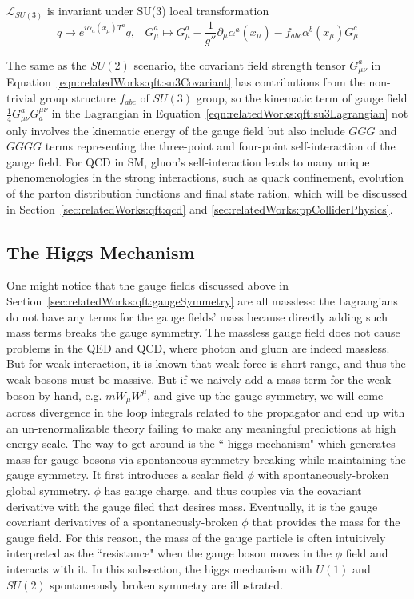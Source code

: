 \noindent $\mathcal{L}_{SU(3)}$ is invariant under SU(3) local transformation 
\begin{equation}
	q \longmapsto  e^{i\alpha_a (x_\mu) T^a} q , \;\;\; 
    G^a_\mu \longmapsto  G^a_\mu - \frac{1}{g''}\partial_\mu \alpha^a(x_\mu) - f_{abc}\alpha^b(x_\mu) G^c_\mu 
\end{equation}



\noindent The same as the $SU(2)$  scenario, the covariant field strength tensor $G^a_{\mu\nu}$ in Equation~\ref{eqn:relatedWorks:qft:su3Covariant}  has contributions from the non-trivial group structure $f_{abc}$ of $SU(3)$ group, so the kinematic term of gauge field $\frac{1}{4}G^a_{\mu\nu}G^{\mu\nu}_a$ in the Lagrangian in Equation~\ref{eqn:relatedWorks:qft:su3Lagrangian} not only involves the kinematic energy of the gauge field but also include $GGG$ and $GGGG$ terms representing the three-point and four-point self-interaction of the gauge field. For QCD in SM, gluon's self-interaction leads to many unique phenomenologies in the strong interactions, such as quark confinement, evolution of the parton distribution functions and final state ration, which will be discussed in Section~\ref{sec:relatedWorks:qft:qcd} and \ref{sec:relatedWorks:ppColliderPhysics}.





\subsection{The Higgs Mechanism}
\label{sec:relatedWorks:qft:higgsMechanism}
One might notice that the gauge fields discussed above in Section~\ref{sec:relatedWorks:qft:gaugeSymmetry} are all massless: the Lagrangians do not have any terms for the gauge fields' mass because directly adding such mass terms breaks the gauge symmetry. The massless gauge field does not cause problems in the QED and QCD, where photon and gluon are indeed massless. But for weak interaction, it is known that weak force is short-range, and thus the weak bosons must be massive. But if we naively add a mass term for the weak boson by hand, e.g. $m W_\mu W^\mu$, and give up the gauge symmetry, we will come across divergence in the loop integrals related to the propagator and end up with an un-renormalizable theory failing to make any meaningful predictions at high energy scale. The way to get around is the `` higgs mechanism" which generates mass for gauge bosons via spontaneous symmetry breaking while maintaining the gauge symmetry. It first introduces a scalar field $\phi$ with spontaneously-broken global symmetry. $\phi$ has gauge charge, and thus couples via the covariant derivative with the gauge filed that desires mass. Eventually, it is the gauge covariant derivatives of a spontaneously-broken $\phi$ that provides the mass for the gauge field. For this reason, the mass of the gauge particle is often intuitively interpreted as the ``resistance" when the gauge boson moves in the $\phi$ field and interacts with it. In this subsection, the higgs mechanism with $U(1)$ and $SU(2)$ spontaneously broken symmetry are illustrated.

